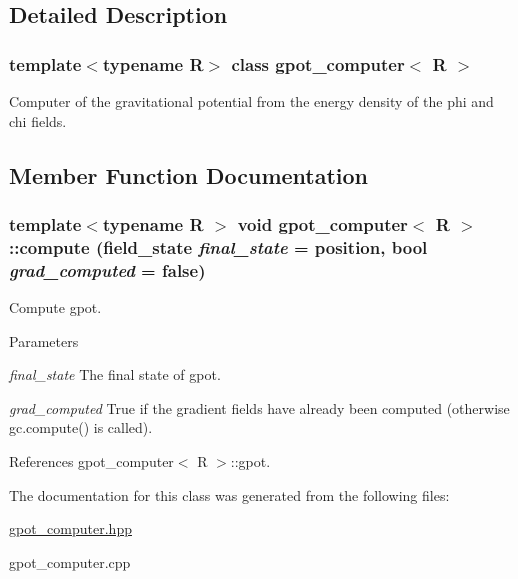 \subsection{Detailed Description}
\subsubsection*{template$<$typename R$>$ class gpot\_\-computer$<$ R $>$}

Computer of the gravitational potential from the energy density of the phi and chi fields. 

\subsection{Member Function Documentation}
\hypertarget{classgpot__computer_adb1fb91c67e82a028c8c161007215915}{
\subsubsection[{compute}]{\setlength{\rightskip}{0pt plus 5cm}template$<$typename R $>$ void {\bf gpot\_\-computer}$<$ R $>$::compute (field\_\-state {\em final\_\-state} = {\ttfamily position}, \/  bool {\em grad\_\-computed} = {\ttfamily false})}}
\label{classgpot__computer_adb1fb91c67e82a028c8c161007215915}


Compute gpot. 
\begin{DoxyParams}{Parameters}
\item[{\em final\_\-state}]The final state of gpot. \item[{\em grad\_\-computed}]True if the gradient fields have already been computed (otherwise gc.compute() is called). \end{DoxyParams}


References gpot\_\-computer$<$ R $>$::gpot.

The documentation for this class was generated from the following files:\begin{DoxyCompactItemize}
\item 
\hyperlink{gpot__computer_8hpp}{gpot\_\-computer.hpp}\item 
gpot\_\-computer.cpp\end{DoxyCompactItemize}
